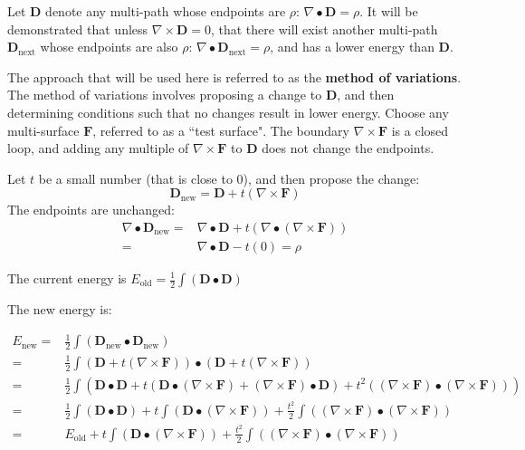 Let \(\mathbf{D}\) denote any multi-path whose endpoints are \(\rho\): \(\nabla \bullet \mathbf{D} = \rho\). It will be demonstrated that unless \(\nabla \times \mathbf{D} = 0\), that there will exist another multi-path \(\mathbf{D}_{\text{next}}\) whose endpoints are also \(\rho\): \(\nabla \bullet \mathbf{D}_{\text{next}} = \rho\), and has a lower energy than \(\mathbf{D}\). 

The approach that will be used here is referred to as the {\bf method of variations}. The method of variations involves proposing a change to \(\mathbf{D}\), and then determining conditions such that no changes result in lower energy. Choose any multi-surface \(\mathbf{F}\), referred to as a ``test surface". The boundary \(\nabla \times \mathbf{F}\) is a closed loop, and adding any multiple of \(\nabla \times \mathbf{F}\) to \(\mathbf{D}\) does not change the endpoints.

Let \(t\) be a small number (that is close to 0), and then propose the change:
\[\mathbf{D}_{\text{new}} = \mathbf{D} + t(\nabla \times \mathbf{F})\]
The endpoints are unchanged:
\begin{align*}
\nabla \bullet \mathbf{D}_{\text{new}} = & \nabla \bullet \mathbf{D} + t(\nabla \bullet (\nabla \times \mathbf{F})) \\ 
= & \nabla \bullet \mathbf{D} - t(0) 
= \rho
\end{align*}

The current energy is \(E_{\text{old}} = \frac{1}{2}\int (\mathbf{D} \bullet \mathbf{D})\)

The new energy is: 

\begin{align*}
E_{\text{new}} = & \frac{1}{2}\int (\mathbf{D}_{\text{new}} \bullet \mathbf{D}_{\text{new}}) \\ 
= & \frac{1}{2}\int (\mathbf{D} + t (\nabla \times \mathbf{F})) \bullet (\mathbf{D} + t (\nabla \times \mathbf{F})) \\ 
= & \frac{1}{2}\int (\mathbf{D} \bullet \mathbf{D} + t(\mathbf{D} \bullet (\nabla \times \mathbf{F}) + (\nabla \times \mathbf{F}) \bullet \mathbf{D}) + t^2((\nabla \times \mathbf{F}) \bullet (\nabla \times \mathbf{F}))) \\
= & \frac{1}{2}\int (\mathbf{D} \bullet \mathbf{D}) + t\int (\mathbf{D} \bullet (\nabla \times \mathbf{F})) + \frac{t^2}{2}\int ((\nabla \times \mathbf{F}) \bullet (\nabla \times \mathbf{F})) \\ 
= & E_{\text{old}} + t\int (\mathbf{D} \bullet (\nabla \times \mathbf{F})) + \frac{t^2}{2}\int ((\nabla \times \mathbf{F}) \bullet (\nabla \times \mathbf{F}))
\end{align*}

